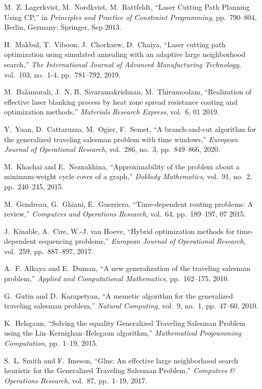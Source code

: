 \begin{thebibliography}{10}
M.~Z. Lagerkvist, M.~Nordkvist, M.~Rattfeldt, ``{Laser Cutting Path
  Planning Using CP},'' in {\em {Principles and Practice of Constraint
  Programming}}, pp.~790--804, Berlin, Germany: Springer, Sep 2013.

H.~Makbul, T.~Viboon, J.~Chorkaew, D.~Chaiya, ``Laser cutting path
  optimization using simulated annealing with an adaptive large neighborhood
  search,'' {\em The International Journal of Advanced Manufacturing
  Technology}, vol.~103, no.~1-4, pp.~781--792, 2019.

M.~Balamurali, J.~N, B.~Sivaramakrishnan, M.~Thirumoolam, ``Realization of
  effective laser blanking process by heat zone spread resistance coating and
  optimization methods,'' {\em Materials Research Express}, vol.~6, 01 2019.

Y.~Yuan, D.~Cattaruzza, M.~Ogier, F.~Semet, ``A branch-and-cut algorithm
  for the generalized traveling salesman problem with time windows,'' {\em
  European Journal of Operational Research}, vol.~286, no.~3, pp.~849--866,
  2020.

M.~Khachai and E.~Neznakhina, ``Approximability of the problem about a
  minimum-weight cycle cover of a graph,'' {\em Doklady Mathematics}, vol.~91,
  no.~2, pp.~240--245, 2015.

M.~Gendreau, G.~Ghiani, E.~Guerriero, ``Time-dependent routing problems: A
  review,'' {\em Computers and Operations Research}, vol.~64, pp.~189--197, 07
  2015.

J.~Kinable, A.~Cire, W.-J. van Hoeve, ``Hybrid optimization methods for
  time-dependent sequencing problems,'' {\em European Journal of Operational
  Research}, vol.~259, pp.~887--897, 2017.

A.~F. Alkaya and E.~Duman, ``A new generalization of the traveling salesman
  problem,'' {\em Applied and Computational Mathematics}, pp.~162--175, 2010.

G.~Gutin and D.~Karapetyan, ``A memetic algorithm for the generalized traveling
  salesman problem,'' {\em Natural Computing}, vol.~9, no.~1, pp.~47--60, 2010.

K.~Helsgaun, ``Solving the equality {G}eneralized {T}raveling {S}alesman
  {P}roblem using the {L}in--{K}ernighan--{H}elsgaun algorithm,'' {\em
  Mathematical Programming Computation}, pp.~1--19, 2015.

S.~L. Smith and F.~Imeson, ``Glns: An effective large neighborhood search
  heuristic for the {G}eneralized {T}raveling {S}alesman {P}roblem,'' {\em
  Computers {\&} Operations Research}, vol.~87, pp.~1--19, 2017.


\end{thebibliography}
